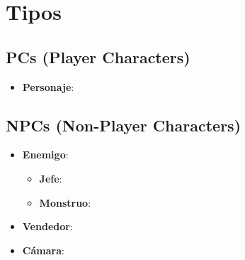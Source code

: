 \section{Tipos} %


\subsection{PCs (Player Characters)} %

\begin{itemize}
    \item \textbf{Personaje}:
\end{itemize}

\subsection{NPCs (Non-Player Characters)} %

\begin{itemize}
    \item \textbf{Enemigo}:
    \begin{itemize}
        \item \textbf{Jefe}:
        \item \textbf{Monstruo}:
    \end{itemize}
    \item \textbf{Vendedor}:
    \item \textbf{Cámara}:
\end{itemize}
